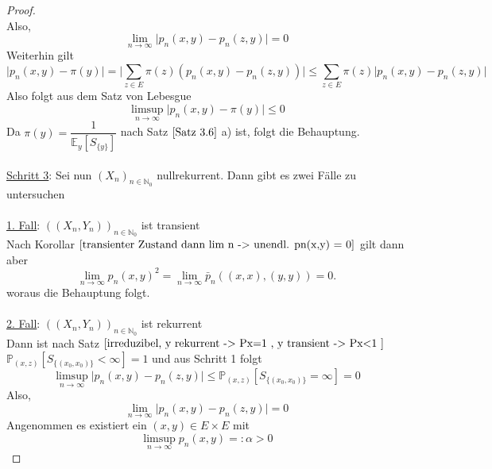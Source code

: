 \documentclass[a4paper,12pt]{scrartcl}
\theoremstyle{definition}
\begin{document}
\begin{proof}
\begin{equation*}
\end{equation*}
Also,
\begin{equation*}
\lim_{n \to \infty} \vert p_{n}(x,y) - p_{n}(z,y) \vert = 0
\end{equation*}
Weiterhin gilt
\begin{equation*}
\vert p_{n}(x,y) - \pi(y) \vert = \vert \sum_{z \in E} \pi(z) \left( p_{n}(x,y) - p_{n}(z,y) \right) \vert \leq \sum_{z \in E} \pi(z) \vert  p_{n}(x,y) - p_{n}(z,y)  \vert
\end{equation*}
Also folgt aus dem Satz von Lebesgue
\begin{equation*}
\limsup_{n \to \infty} \vert p_{n}(x,y) - \pi(y) \vert \leq 0
\end{equation*}
Da $\pi(y) = \dfrac{1}{\mathbb{E}_{y}[S_{\lbrace y \rbrace}]}$ nach Satz $\ref{Satz 3.6}$ a) ist, folgt die Behauptung.
\\
\\
\underline{Schritt 3}: Sei nun $(X_{n})_{n \in \mathbb{N}_{0}}$ nullrekurrent. Dann gibt es zwei Fälle zu untersuchen
\\
\\
\underline{1. Fall}: $((X_{n},Y_{n}))_{n \in \mathbb{N}_{0}}$ ist transient
\\
Nach Korollar $\ref{transienter Zustand dann lim n -> unendl. pn(x,y) = 0}$ gilt dann aber
\begin{equation*}
\lim_{n \to \infty} p_{n}(x,y)^{2} = \lim_{n \to \infty} \bar{p}_{n}((x,x),(y,y)) = 0.
\end{equation*}
woraus die Behauptung folgt.
\\
\\
\underline{2. Fall}: $((X_{n},Y_{n}))_{n \in \mathbb{N}_{0}}$ ist rekurrent
\\
Dann ist nach Satz $\ref{irreduzibel, y rekurrent -> Px=1 , y transient -> Px<1 }$ $\mathbb{P}_{(x,z)}[S_{\lbrace (x_{0},x_{0}) \rbrace} < \infty] = 1$ und aus Schritt 1 folgt
\begin{equation*}
\limsup_{n \to \infty} \vert p_{n}(x,y) - p_{n}(z,y) \vert \leq \mathbb{P}_{(x,z)}[S_{\lbrace (x_{0},x_{0}) \rbrace} = \infty] = 0
\end{equation*}
Also,
\begin{equation*}
\lim_{n \to \infty} \vert p_{n}(x,y) - p_{n}(z,y) \vert = 0
\end{equation*}
Angenommen es existiert ein $(x,y) \in E \times E$ mit 
\begin{equation*}
\limsup_{n \to \infty} p_{n}(x,y) =: \alpha > 0
\end{equation*}

\end{proof}
\end{document}
